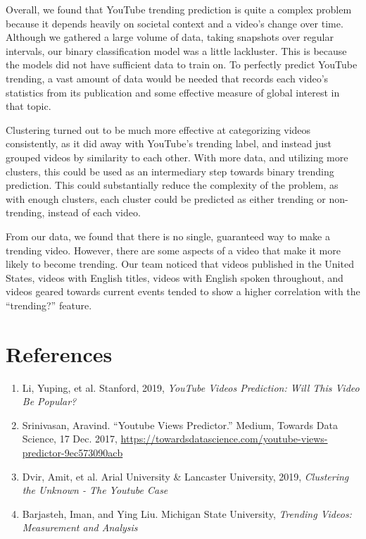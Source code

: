 \documentclass{article}
\begin{document}
\quad Overall, we found that YouTube trending prediction is quite a complex problem because it depends heavily on societal context and a video’s change over time. Although we gathered a large volume of data, taking snapshots over regular intervals, our binary classification model was a little lackluster. This is because the models did not have sufficient data to train on. To perfectly predict YouTube trending, a vast amount of data would be needed that records each video’s statistics from its publication and some effective measure of global interest in that topic.
\par Clustering turned out to be much more effective at categorizing videos consistently, as it did away with YouTube’s trending label, and instead just grouped videos by similarity to each other. With more data, and utilizing more clusters, this could be used as an intermediary step towards binary trending prediction. This could substantially reduce the complexity of the problem, as with enough clusters, each cluster could be predicted as either trending or non-trending, instead of each video.
\par From our data, we found that there is no single, guaranteed way to make a trending video. However, there are some aspects of a video that make it more likely to become trending. Our team noticed that videos published in the United States, videos with English titles, videos with English spoken throughout, and videos geared towards current events tended to show a higher correlation with the “trending?” feature.


\section*{References}
\begin{enumerate}
  \item Li, Yuping, et al. Stanford, 2019, \textit{YouTube Videos Prediction: Will This Video Be Popular?} 
  \item Srinivasan, Aravind. “Youtube Views Predictor.” Medium, Towards Data Science, 17 Dec. 2017, \href{https://towardsdatascience.com/youtube-views-predictor-9ec573090acb}{https://towardsdatascience.com/youtube-views-predictor-9ec573090acb}
  \item Dvir, Amit, et al. Arial University \& Lancaster University, 2019, \textit{Clustering the Unknown - The Youtube Case}
  \item Barjasteh, Iman, and Ying Liu. Michigan State University, \textit{Trending Videos: Measurement and Analysis}
\end{enumerate}
\end{document}

